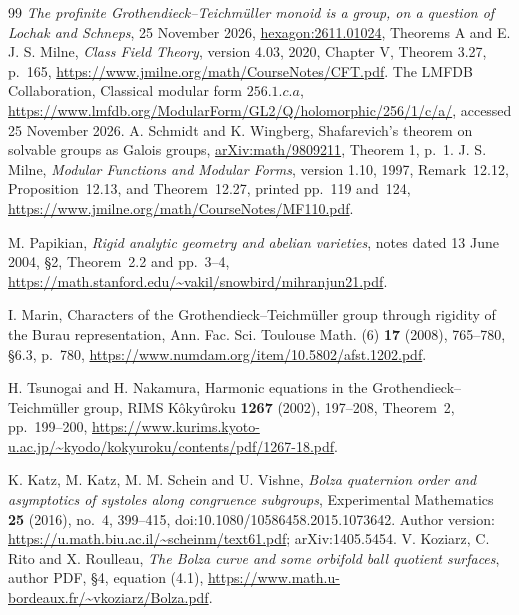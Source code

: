 \documentclass[11pt,a4paper]{article}
\theoremstyle{definition}
\theoremstyle{remark}
\begin{document}
\begin{thebibliography}{99}
 \emph{The profinite Grothendieck--Teichm\"uller monoid is a group, on a question of Lochak and Schneps}, 25 November 2026, \href{https://hexagonmath.org/2611.01024}{hexagon:2611.01024}, Theorems A and E.
 J. S. Milne, \emph{Class Field Theory}, version 4.03, 2020, Chapter V, Theorem 3.27, p.~165, \url{https://www.jmilne.org/math/CourseNotes/CFT.pdf}.
 The LMFDB Collaboration, Classical modular form $256.1.c.a$, \url{https://www.lmfdb.org/ModularForm/GL2/Q/holomorphic/256/1/c/a/}, accessed 25 November 2026.
 A. Schmidt and K. Wingberg, Shafarevich's theorem on solvable groups as Galois groups, \href{https://arxiv.org/abs/math/9809211}{arXiv:math/9809211}, Theorem 1, p.~1.
J. S. Milne, \emph{Modular Functions and Modular Forms},
version 1.10, 1997, Remark~12.12, Proposition~12.13,
and Theorem~12.27, printed pp.~119 and~124,
\url{https://www.jmilne.org/math/CourseNotes/MF110.pdf}.

M. Papikian, \emph{Rigid analytic geometry and abelian varieties},
notes dated 13 June 2004, \S2, Theorem~2.2 and pp.~3--4,
\url{https://math.stanford.edu/~vakil/snowbird/mihranjun21.pdf}.

I. Marin, Characters of the Grothendieck--Teichm\"uller group through
rigidity of the Burau representation, Ann. Fac. Sci. Toulouse Math.
(6) \textbf{17} (2008), 765--780, \S6.3, p.~780,
\url{https://www.numdam.org/item/10.5802/afst.1202.pdf}.

H. Tsunogai and H. Nakamura, Harmonic equations in the
Grothendieck--Teichm\"uller group, RIMS K\^oky\^uroku
\textbf{1267} (2002), 197--208, Theorem~2, pp.~199--200,
\url{https://www.kurims.kyoto-u.ac.jp/~kyodo/kokyuroku/contents/pdf/1267-18.pdf}.


K. Katz, M. Katz, M. M. Schein and U. Vishne,
\emph{Bolza quaternion order and asymptotics of systoles along
congruence subgroups}, Experimental Mathematics \textbf{25}
(2016), no.~4, 399--415,
doi:10.1080/10586458.2015.1073642.
Author version: \url{https://u.math.biu.ac.il/~scheinm/text61.pdf};
arXiv:1405.5454.
V. Koziarz, C. Rito and X. Roulleau,
\emph{The Bolza curve and some orbifold ball quotient surfaces},
author PDF, \S4, equation (4.1),
\url{https://www.math.u-bordeaux.fr/~vkoziarz/Bolza.pdf}.


\end{thebibliography}
\end{document}
